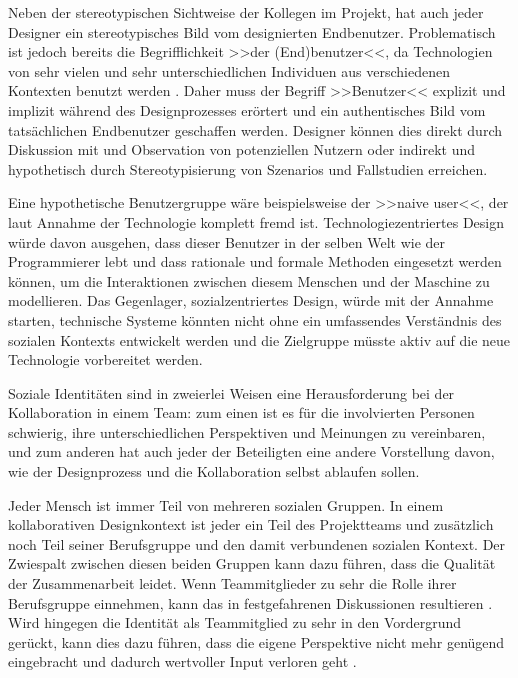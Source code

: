 \medskip Neben der stereotypischen Sichtweise der Kollegen im Projekt, hat auch jeder Designer ein stereotypisches Bild vom designierten Endbenutzer. Problematisch ist jedoch bereits die Begrifflichkeit >>der (End)benutzer<<, da Technologien von sehr vielen und sehr unterschiedlichen Individuen aus verschiedenen Kontexten benutzt werden \citep{Agre:1995}. Daher muss der Begriff >>Benutzer<< explizit und implizit während des Designprozesses erörtert und ein authentisches Bild vom tatsächlichen Endbenutzer geschaffen werden. Designer können dies direkt durch Diskussion mit und Observation von potenziellen Nutzern oder indirekt und hypothetisch durch Stereotypisierung von Szenarios und Fallstudien erreichen.

\medskip Eine hypothetische Benutzergruppe wäre beispielsweise der >>naive user<<, der laut Annahme der Technologie komplett fremd ist. Technologiezentriertes Design würde davon ausgehen, dass dieser Benutzer in der selben Welt wie der Programmierer lebt und dass rationale und formale Methoden eingesetzt werden können, um die Interaktionen zwischen diesem Menschen und der Maschine zu modellieren. Das Gegenlager, sozialzentriertes Design, würde mit der Annahme starten, technische Systeme könnten nicht ohne ein umfassendes Verständnis des sozialen Kontexts entwickelt werden und die Zielgruppe müsste aktiv auf die neue Technologie vorbereitet werden.

\medskip Soziale Identitäten sind in zweierlei Weisen eine Herausforderung bei der Kollaboration in einem Team: zum einen ist es für die involvierten Personen schwierig, ihre unterschiedlichen Perspektiven und Meinungen zu vereinbaren, und zum anderen hat auch jeder der Beteiligten eine andere Vorstellung davon, wie der Designprozess und die Kollaboration selbst ablaufen sollen.

Jeder Mensch ist immer Teil von mehreren sozialen Gruppen. In einem kollaborativen Designkontext ist jeder ein Teil des Projektteams und zusätzlich noch Teil seiner Berufsgruppe und den damit verbundenen sozialen Kontext. Der Zwiespalt zwischen diesen beiden Gruppen kann dazu führen, dass die Qualität der Zusammenarbeit leidet. Wenn Teammitglieder zu sehr die Rolle ihrer Berufsgruppe einnehmen, kann das in festgefahrenen Diskussionen resultieren \citep{Kilker:1999}. Wird hingegen die Identität als Teammitglied zu sehr in den Vordergrund gerückt, kann dies dazu führen, dass die eigene Perspektive nicht mehr genügend eingebracht und dadurch wertvoller Input verloren geht \citep{Irving:1982}.

